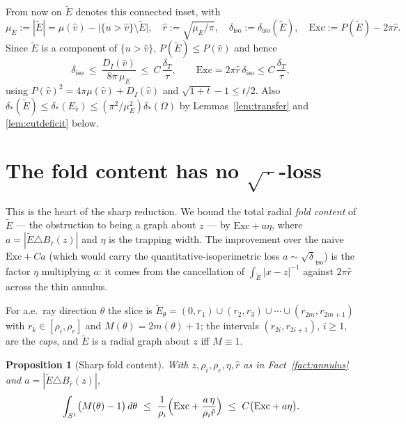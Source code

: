 \documentclass[11pt]{article}
\newtheorem{proposition}[theorem]{Proposition}
\theoremstyle{definition}
\newcommand{\Om}{\Omega}
\newcommand{\dT}{\delta_T}
\newcommand{\diso}{\delta_{\mathrm{iso}}}
\newcommand{\Etil}{\widetilde E}
\newcommand{\Exc}{\mathrm{Exc}}
\newcommand{\abs}[1]{\left|#1\right|}
\newcommand{\dstar}{\delta_{*}}
\begin{document}
From now on $\Etil$ denotes this connected inset, with
\[
   \mu_E:=\abs\Etil=\mu(\hat v)-\bigl|\{u>\hat v\}\setminus\Etil\bigr|,
   \quad
   \hat r:=\sqrt{\mu_E/\pi},
   \quad
   \diso:=\diso(\Etil),
   \quad
   \Exc:=P(\Etil)-2\pi\hat r .
\]
Since $\Etil$ is a component of $\{u>\hat v\}$,
$P(\Etil)\le P(\hat v)$ and hence
\begin{equation}\label{eq:disoE}
   \diso\ \le\ \frac{D_I(\hat v)}{8\pi\,\mu_E}\ \le\ C\,\frac{\dT}{\tau},
   \qquad
   \Exc=2\pi\hat r\,\diso\le C\,\frac{\dT}{\tau},
\end{equation}
using $P(\hat v)^2=4\pi\mu(\hat v)+D_I(\hat v)$ and
$\sqrt{1+t}-1\le t/2$. Also $\dstar(\Etil)\le\dstar(E_{\hat v})\le
(\pi^2/\mu_E^2)\dstar(\Om)$ by Lemmas~\ref{lem:transfer} and
\ref{lem:cutdeficit} below.

\section{The fold content has no \texorpdfstring{$\sqrt{\,\cdot\,}$}{sqrt}-loss}
\label{sec:fold}

This is the heart of the sharp reduction. We bound the total radial
\emph{fold content} of $\Etil$ — the obstruction to being a graph about $z$ —
by $\Exc+a\eta$, where $a=\abs{\Etil\triangle B_{\hat r}(z)}$ and $\eta$ is
the trapping width. The improvement over the naive $\Exc+Ca$ (which would
carry the quantitative-isoperimetric loss $a\sim\sqrt\diso$) is the factor
$\eta$ multiplying $a$: it comes from the cancellation of
$\int_{\Etil}\abs{x-z}^{-1}$ against $2\pi\hat r$ across the thin annulus.

For a.e.\ ray direction $\theta$ the slice is
$\Etil_\theta=(0,r_1)\cup(r_2,r_3)\cup\cdots\cup(r_{2m},r_{2m+1})$ with
$r_k\in[\rho_i,\rho_e]$ and $M(\theta)=2m(\theta)+1$; the intervals
$(r_{2i},r_{2i+1})$, $i\ge1$, are the \emph{caps}, and $\Etil$ is a radial
graph about $z$ iff $M\equiv1$.

\begin{proposition}[Sharp fold content]\label{prop:fold}
With $z,\rho_i,\rho_e,\eta,\hat r$ as in Fact~\ref{fact:annulus} and
$a=\abs{\Etil\triangle B_{\hat r}(z)}$,
\begin{equation}\label{eq:foldsharp}
   \int_{S^1}\bigl(M(\theta)-1\bigr)\,d\theta
   \ \le\ \frac{1}{\rho_i}\Bigl(\Exc+\frac{a\,\eta}{\rho_i\hat r}\Bigr)
   \ \le\ C\bigl(\Exc+a\eta\bigr).
\end{equation}
\end{proposition}
\end{document}
